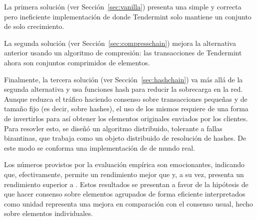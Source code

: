 %
La primera solución (ver Sección~\ref{sec:vanilla}) presenta una simple y
correcta pero ineficiente implementación de \setchain donde Tendermint solo mantiene
un conjunto de solo crecimiento.

%
La segunda solución (ver Sección~\ref{sec:compresschain}) mejora la alternativa anterior
usando un algoritmo de compresión: las transacciones de Tendermint ahora son conjuntos
comprimidos de elementos.

%
Finalmente, la tercera solución (ver Sección~\ref{sec:hashchain}) va más allá de la
segunda alternativa y usa funciones hash para reducir la sobrecarga en la red.
Aunque reduzca el tráfico haciendo consenso sobre transacciones pequeñas
y de tamaño fijo (es decir, sobre hashes), el uso de los mismos requiere de una forma de
invertirlos para así obtener los elementos originales enviados por los clientes.
Para resovler esto, se diseñó
un algoritmo distribuido, tolerante a fallas bizantinas, que trabaja como un objeto
distribuido de resolución de hashes.
De este modo se conforma una implementación de \setchain de mundo real.

%
%


Los números provistos por la evaluación empírica son emocionantes, indicando que,
efectivamente, \compresschain permite un rendimiento mejor que \vanilla y, a su vez,
\hashchain presenta un rendimiento superior a \compresschain.
Estos resultados se presentan a favor de la hipótesis de que hacer consenso sobre
elementos agrupados de forma eficiente interpretados como unidad representa una
mejora en comparación con el consenso usual, hecho sobre elementos individuales. 

